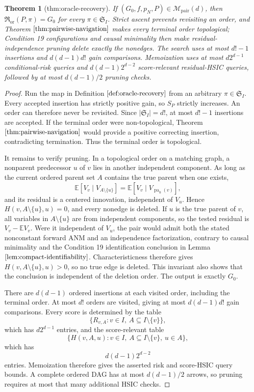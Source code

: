 \documentclass{article}
\newtheorem{theorem}{Theorem}
\begin{document}
\begin{theorem}[thm:oracle-recovery]\label{thm:oracle-recovery}
If \((G_0,f,p_N,P)\in\mathcal M_{\mathrm{pair}}(d)\), then \(\mathfrak R_{\mathrm{or}}(P,\pi)=G_0\) for every \(\pi\in\mathfrak S_I\). Strict ascent prevents revisiting an order, and Theorem \(\ref{thm:pairwise-navigation}\) makes every terminal order topological; Condition 19 configurations and causal minimality then make residual-independence pruning delete exactly the nonedges. The search uses at most \(d!-1\) insertions and \(d(d-1)d!\) gain comparisons. Memoization uses at most \(d2^{d-1}\) conditional-risk queries and \(d(d-1)2^{d-2}\) score-relevant residual-HSIC queries, followed by at most \(d(d-1)/2\) pruning checks.
\end{theorem}
\begin{proof}
Run the map in Definition \(\ref{def:oracle-recovery}\) from an arbitrary \(\pi\in\mathfrak S_I\).  Every accepted insertion has strictly positive gain, so \(S_P\) strictly increases.  An order can therefore never be revisited.  Since \(|\mathfrak S_I|=d!\), at most \(d!-1\) insertions are accepted.  If the terminal order were non-topological, Theorem \(\ref{thm:pairwise-navigation}\) would provide a positive correcting insertion, contradicting termination.  Thus the terminal order is topological.

It remains to verify pruning.  In a topological order on a matching graph, a nonparent predecessor \(u\) of \(v\) lies in another independent component.  As long as the current ordered parent set \(A\) contains the true parent when one exists,
\[
 \mathbb E[V_v\mid V_{A\setminus\{u\}}]
 =\mathbb E[V_v\mid V_{\operatorname{pa}_0(v)}],
\]
and its residual is a centered innovation, independent of \(V_u\).  Hence \(H(v,A\setminus\{u\},u)=0\), and every nonedge is deleted.  If \(u\) is the true parent of \(v\), all variables in \(A\setminus\{u\}\) are from independent components, so the tested residual is \(V_v-\mathbb E V_v\).  Were it independent of \(V_u\), the pair would admit both the stated nonconstant forward ANM and an independence factorization, contrary to causal minimality and the Condition 19 identification conclusion in Lemma \(\ref{lem:compact-identifiability}\).  Characteristicness therefore gives \(H(v,A\setminus\{u\},u)>0\), so no true edge is deleted.  This invariant also shows that the conclusion is independent of the deletion order.  The output is exactly \(G_0\).

There are \(d(d-1)\) ordered insertions at each visited order, including the terminal order.  At most \(d!\) orders are visited, giving at most \(d(d-1)d!\) gain comparisons.  Every score is determined by the table
\[
 \{R_{v,A}:v\in I,\ A\subseteq I\setminus\{v\}\},
\]
which has \(d2^{d-1}\) entries, and the score-relevant table
\[
 \{H(v,A,u):v\in I,\ A\subseteq I\setminus\{v\},\ u\in A\},
\]
which has
\[
 d(d-1)2^{d-2}
\]
entries.  Memoization therefore gives the asserted risk and score-HSIC query bounds.  A complete ordered DAG has at most \(d(d-1)/2\) arrows, so pruning requires at most that many additional HSIC checks.
\end{proof}
\end{document}
